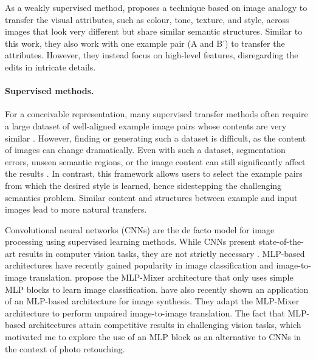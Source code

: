
As a weakly supervised method, \citeauthor{visual_attribute} \cite{visual_attribute} proposes a technique based on image analogy \cite{Hertzmann01Image} to transfer the visual attributes, such as colour, tone, texture, and style, across images that look very different but share similar semantic structures. Similar to this work, they also work with one example pair (A and B') to transfer the attributes. However, they instead focus on high-level features, disregarding the edits in intricate details.

\paragraph{Supervised methods.} 
For a conceivable representation, many supervised transfer methods often require a large dataset of well-aligned example image pairs whose contents are very similar \cite{kim2021representative, wang2019underexposed}. However, finding or generating such a dataset is difficult, as the content of images can change dramatically. Even with such a dataset, segmentation errors, unseen semantic regions, or the image content can still significantly affect the results \cite{10.1145/2790296}. In contrast, this framework allows users to select the example pairs from which the desired style is learned, hence sidestepping the challenging semantics problem. Similar content and structures between example and input images lead to more natural transfers.

Convolutional neural networks (CNNs) are the de facto model for image processing using supervised learning methods. While CNNs present state-of-the-art results in computer vision tasks, they are not strictly necessary \cite{tolstikhin2021mlp}. MLP-based architectures have recently gained popularity in image classification and image-to-image translation. \citeauthor{cazenavette2021mixergan} \cite{cazenavette2021mixergan} propose the MLP-Mixer architecture that only uses simple MLP blocks to learn image classification. \citeauthor{cazenavette2021mixergan} \cite{cazenavette2021mixergan} have also recently shown an application of an MLP-based architecture for image synthesis. They adapt the MLP-Mixer architecture \cite{tolstikhin2021mlp} to perform unpaired image-to-image translation. The fact that MLP-based architectures attain competitive results in challenging vision tasks, which motivated me to explore the use of an MLP block as an alternative to CNNs in the context of photo retouching.

